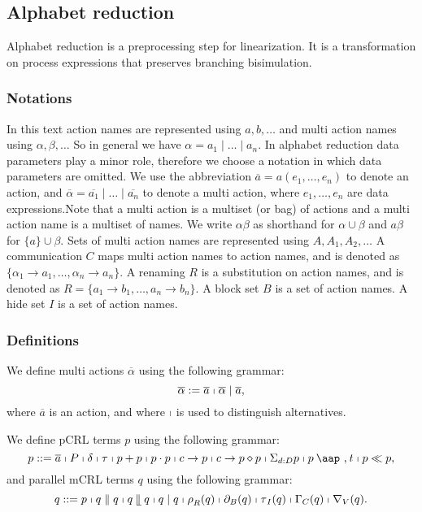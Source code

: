 \documentclass{article}
\providecommand{\at}{\mathbin{\mbox{\aap ,}}}
\providecommand{\leftmerge}{\mathbin{\mathrel{\llfloor}}}
\begin{document}
\newpage

\subsection{Alphabet reduction}

Alphabet reduction is a preprocessing step for linearization. It is a
transformation on process expressions that preserves branching bisimulation.

\subsubsection{Notations}

In this text action names are represented using $a,b,\ldots $ and multi
action names using $\alpha ,\beta ,\ldots $ So in general we have $\alpha
=a_{1}\mid \ldots \mid a_{n}$. In alphabet reduction data parameters play a
minor role, therefore we choose a notation in which data parameters are
omitted. We use the abbreviation $\overline{a}=a(e_{1},\ldots ,e_{n})$ to
denote an action, and $\overline{\alpha }=\overline{a_{1}}\mid \ldots \mid
\overline{a_{n}}$ to denote a multi action, where $e_{1},\ldots ,e_{n}$ are
data expressions.Note that a multi action is a multiset (or bag) of actions
and a multi action name is a multiset of names. We write $\alpha \beta $ as
shorthand for $\alpha \cup \beta $ and $a\beta $ for $\{a\}\cup \beta $.
Sets of multi action names are represented using $A,A_{1},A_{2},\ldots $ A
communication $C$ maps multi action names to action names, and is denoted as
$\{\alpha _{1}\rightarrow a_{1},\ldots ,\alpha _{n}\rightarrow a_{n}\}$. A
renaming $R$ is a substitution on action names, and is denoted as $%
R=\{a_{1}\rightarrow b_{1},\ldots ,a_{n}\rightarrow b_{n}\}$. A block set $B$
is a set of action names. A hide set $I$ is a set of action names.

\subsubsection{Definitions}

We define multi actions $\overline{\alpha }$ using the following grammar:%
\[
\overline{\alpha }:=\overline{a}\shortmid \overline{\alpha }\mid \overline{a}%
,
\]%
where $\overline{a}$ is an action, and where $\shortmid $ is used to
distinguish alternatives.

We define pCRL terms $p$ using the following grammar:%
\[
p::=\overline{a}\shortmid P\shortmid \delta \shortmid \tau \shortmid
p+p\shortmid p\cdot p\shortmid c\rightarrow p\shortmid c\rightarrow
p\diamond p\shortmid \Sigma _{d:D}p\shortmid p\at t\shortmid p\ll p,
\]%
and parallel mCRL terms $q$ using the following grammar:%
\[
q::=p\shortmid q\parallel q\shortmid q\leftmerge q\shortmid q\mid q\shortmid
\rho _{R}(q)\shortmid \partial _{B}(q)\shortmid \tau _{I}(q)\shortmid \Gamma
_{C}(q)\shortmid \nabla _{V}(q).
\]
\end{document}
